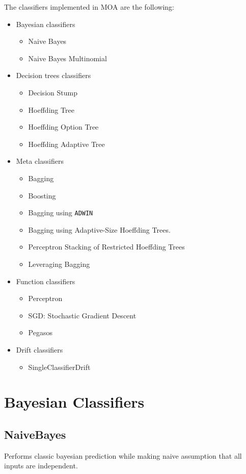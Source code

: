\documentclass[a4paper,12pt,twoside]{book}
\begin{document}
The classifiers implemented in MOA are the following:

\begin{itemize}
\item Bayesian classifiers
\begin{itemize}
\item Naive Bayes
\item Naive Bayes Multinomial
\end{itemize}
\item Decision trees classifiers
\begin{itemize}
\item  Decision Stump
\item  Hoeffding Tree
\item  Hoeffding Option Tree
\item Hoeffding Adaptive Tree
\end{itemize}
\item Meta classifiers
\begin{itemize}
\item  Bagging
\item  Boosting
\item  Bagging using \texttt{ADWIN}
\item  Bagging using Adaptive-Size Hoeffding Trees.
\item Perceptron Stacking of Restricted Hoeffding Trees
\item Leveraging Bagging
\end{itemize}
\item Function classifiers
\begin{itemize}
\item  Perceptron
\item  SGD: Stochastic Gradient Descent
\item  Pegasos
\end{itemize}
\item Drift classifiers
\begin{itemize}
\item SingleClassifierDrift
\end{itemize}
\end{itemize}

\section{Bayesian Classifiers}

\subsection{NaiveBayes} 
Performs classic bayesian prediction while making naive assumption that all inputs are independent.
\end{document}
